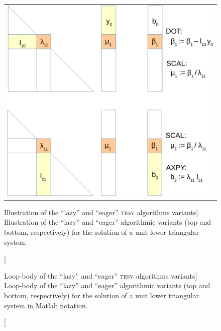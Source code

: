 \begin{figure}[t]
\begin{center}
\begin{tabular}{c}
\includegraphics[width=.5\columnwidth]{plots/lazy_eagar}
\end{tabular}
\end{center}
\caption
[Illustration of the ``lazy'' and ``eager'' \textsc{trsv} algorithms variants]
{Illustration of the ``lazy'' and ``eager'' algorithmic variants (top and bottom, respectively)
    for the solution of a unit lower triangular system.}
\label{2017-lu-block-jacobi:fig:trsfig}
\end{figure}


\begin{figure}[t]
\begin{center}
\begin{minipage}{0.9\columnwidth}
{\small

}
\end{minipage}
\begin{minipage}{0.9\columnwidth}
{\small

}
\end{minipage}
\caption
[Loop-body of the ``lazy'' and ``eager'' \textsc{trsv} algorithms variants]
{Loop-body of the ``lazy'' and ``eager'' algorithmic variants (top and bottom, respectively)
for the solution of a unit lower triangular system in Matlab notation.}
\label{2017-lu-block-jacobi:fig:trs}
\end{center}
\end{figure}


